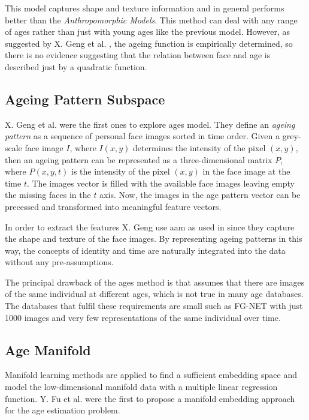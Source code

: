 This model captures shape and texture information and in general performs better than the \textit{Anthropomorphic Models}. This method can deal with any range of ages rather than just with young ages like the previous model. However, as suggested by X. Geng et al. \cite{Geng:2006:LFA:1180639.1180711}, the ageing function is empirically determined, so there is no evidence suggesting that the relation between face and age is described just by a quadratic function.

\subsection{Ageing Pattern Subspace}\label{subsec:APS}

X. Geng et al. \cite{4359348, Geng:2006:LFA:1180639.1180711} were the first ones to explore \gls{ages} model. They define an \textit{ageing pattern} as a sequence of personal face images sorted in time order. Given a grey-scale face image $I$, where $I(x,y)$ determines the intensity of the pixel $(x,y)$, then an ageing pattern can be represented as a three-dimensional matrix $P$, where $P(x,y,t)$ is the intensity of the pixel $(x,y)$ in the face image at the time $t$. The images vector is filled with the available face images leaving empty the missing faces in the $t$ axis. Now, the images in the age pattern vector can be precessed and transformed into meaningful feature vectors.

In order to extract the features X. Geng use \gls{aam} as used in \cite{791208} since they capture the shape and texture of the face images. By representing ageing patterns in this way, the concepts of identity and time are naturally integrated into the data without any pre-assumptions.

The principal drawback of the \gls{ages} method is that assumes that there are images of the same individual at different ages, which is not true in many age databases. The databases that fulfil these requirements are small such as FG-NET \cite{FGNET} with just 1000 images and very few representations of the same individual over time.

\subsection{Age Manifold}\label{subsec:manifold}
 
Manifold learning methods are applied to find a sufficient embedding space and model the low-dimensional manifold data with a multiple linear regression function. Y. Fu et al. \cite{4523958, 4284917} were the first to propose a manifold embedding approach for the age estimation problem. 


